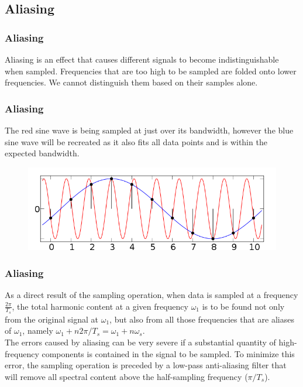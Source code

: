 \subsection{Aliasing}

\begin{frame}
	\frametitle{Aliasing}
	\begin{definition}
	Aliasing is	an effect that causes different signals to become indistinguishable when sampled. Frequencies that are too high to be sampled are folded onto lower frequencies. We cannot distinguish them based on their samples alone.
	\end{definition}
\end{frame}

\begin{frame}
	\frametitle{Aliasing}
	\begin{example}
	The red sine wave is being sampled at just over its bandwidth, however the blue sine wave will be recreated as it also fits all data points and is within the expected bandwidth.
	\vspace{-0.7em}
	\begin{figure}
		\includegraphics[width=1\linewidth]{aliasing}
	\end{figure}
	\end{example}
\end{frame}

\begin{frame}
	\frametitle{Aliasing}
	As a direct result of the sampling operation, when data is sampled at a frequency $\frac{2\pi}{T_s}$, the total harmonic content at a given frequency $\omega_1$ is to be found not only from the original signal at $\omega_1$, but also from all those frequencies that are aliases of $\omega_1$, namely $\omega_1 + n2\pi/T_s = \omega_1+n\omega_s$.\\
	\vspace{1em}
	The errors caused by aliasing can be very severe if a substantial quantity of high-frequency components is contained in the signal to be sampled. To minimize this error, the sampling operation is preceded by a low-pass anti-aliasing filter that will remove all spectral content above the half-sampling frequency ($\pi/T_s$).
\end{frame}

